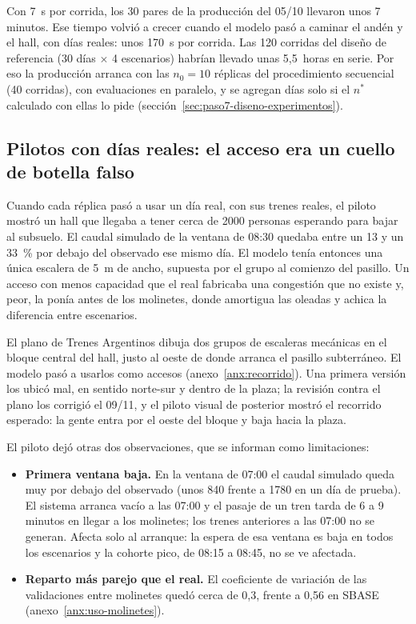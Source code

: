 Con 7~s por corrida, los 30 pares de la producción del 05/10 llevaron unos 7 minutos. Ese tiempo volvió a
crecer cuando el modelo pasó a caminar el andén y el hall, con días reales: unos 170~s por corrida. Las 120
corridas del diseño de referencia (30 días $\times$ 4 escenarios) habrían llevado unas 5,5~horas en serie. Por
eso la producción arranca con las $n_0 = 10$ réplicas del procedimiento secuencial (40 corridas), con
evaluaciones en paralelo, y se agregan días solo si el $n^{*}$ calculado con ellas lo pide
(sección~\ref{sec:paso7-diseno-experimentos}).

\subsection{Pilotos con días reales: el acceso era un cuello de botella falso}

Cuando cada réplica pasó a usar un día real, con sus trenes reales, el piloto mostró un hall que llegaba a
tener cerca de \num{2000} personas esperando para bajar al subsuelo. El caudal simulado de la ventana de 08:30
quedaba entre un 13 y un 33~\% por debajo del observado ese mismo día. El modelo tenía entonces una única
escalera de 5~m de ancho, supuesta por el grupo al comienzo del pasillo. Un acceso con menos capacidad que el
real fabricaba una congestión que no existe y, peor, la ponía antes de los molinetes, donde amortigua las
oleadas y achica la diferencia entre escenarios.

El plano de Trenes Argentinos dibuja dos grupos de escaleras mecánicas en el bloque central del hall, justo al
oeste de donde arranca el pasillo subterráneo. El modelo pasó a usarlos como accesos
(anexo~\ref{anx:recorrido}). Una primera versión los ubicó mal, en sentido norte-sur y
dentro de la plaza; la revisión contra el plano los corrigió el 09/11, y el piloto visual de \EO{} posterior
mostró el recorrido esperado: la gente entra por el oeste del bloque y baja hacia la plaza.

El piloto dejó otras dos observaciones, que se informan como limitaciones:
\begin{itemize}
  \item \textbf{Primera ventana baja.} En la ventana de 07:00 el caudal simulado queda muy por debajo del
        observado (unos 840 frente a \num{1780} en un día de prueba). El sistema arranca vacío a las 07:00 y el
        pasaje de un tren tarda de 6 a 9 minutos en llegar a los molinetes; los trenes anteriores a las 07:00 no
        se generan. Afecta solo al arranque: la espera de esa ventana es baja en todos los escenarios y la
        cohorte pico, de 08:15 a 08:45, no se ve afectada.
  \item \textbf{Reparto más parejo que el real.} El coeficiente de variación de las validaciones entre
        molinetes quedó cerca de 0,3, frente a 0,56 en SBASE (anexo~\ref{anx:uso-molinetes}).
\end{itemize}

